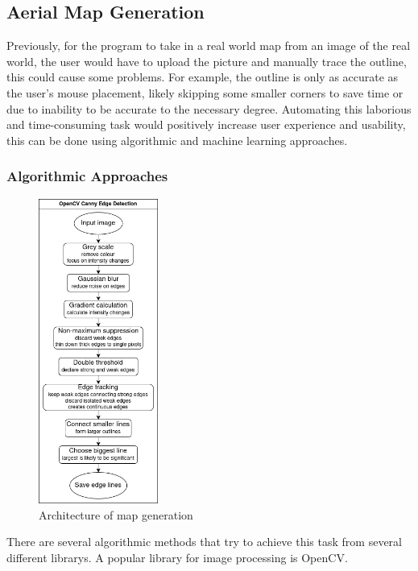 \documentclass[final]{cmpreport_02}
\begin{document}
\subsection{Aerial Map Generation}
Previously, for the program to take in a real world map from an image of the real world, the user would have to upload the picture and manually trace the outline, this could cause some problems.
For example, the outline is only as accurate as the user's mouse placement, likely skipping some smaller corners to save time or due to inability to be accurate to the necessary degree.
Automating this laborious and time-consuming task would positively increase user experience and usability, this can be done using algorithmic and machine learning approaches.

\subsubsection{Algorithmic Approaches}


\begin{figure}[H]
	\centering
	\includegraphics[width=0.35\textwidth]{./images/openCV.drawio.png}
	\caption{Architecture of map generation}
	\label{AE:openCVarch}
\end{figure}



There are several algorithmic methods that try to achieve this task from several different librarys. A popular library for image processing is OpenCV\citep{opencv_library}.
\end{document}
